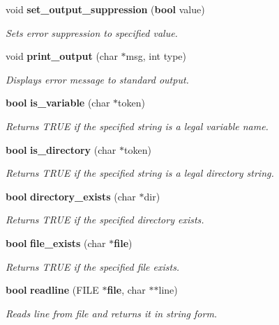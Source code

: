 \begin{CompactItemize}
\item 
void {\bf set\_\-output\_\-suppression} ({\bf bool} value)
\begin{CompactList}\small\item\em Sets error suppression to specified value.\item\end{CompactList}\item 
void {\bf print\_\-output} (char $\ast$msg, int type)
\begin{CompactList}\small\item\em Displays error message to standard output.\item\end{CompactList}\item 
{\bf bool} {\bf is\_\-variable} (char $\ast$token)
\begin{CompactList}\small\item\em Returns TRUE if the specified string is a legal variable name.\item\end{CompactList}\item 
{\bf bool} {\bf is\_\-directory} (char $\ast$token)
\begin{CompactList}\small\item\em Returns TRUE if the specified string is a legal directory string.\item\end{CompactList}\item 
{\bf bool} {\bf directory\_\-exists} (char $\ast$dir)
\begin{CompactList}\small\item\em Returns TRUE if the specified directory exists.\item\end{CompactList}\item 
{\bf bool} {\bf file\_\-exists} (char $\ast${\bf file})
\begin{CompactList}\small\item\em Returns TRUE if the specified file exists.\item\end{CompactList}\item 
{\bf bool} {\bf readline} (FILE $\ast${\bf file}, char $\ast$$\ast$line)
\begin{CompactList}\small\item\em Reads line from file and returns it in string form.\item\end{CompactList}\item 
$$
\end{CompactItemize}

